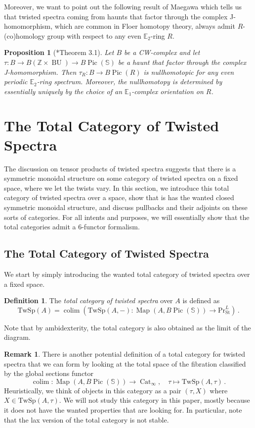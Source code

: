 \documentclass[10pt]{amsart}
\newcommand{\longto}{\longrightarrow}
\theoremstyle{plain}
\newtheorem{proposition}[theorem]{Proposition}
\theoremstyle{definition}
\newtheorem{definition}[theorem]{Definition}
\newtheorem{rmk}[theorem]{Remark}
\DeclareMathOperator*{\colim}{colim}
\DeclareMathOperator{\Pic}{Pic}
\DeclareMathOperator{\Map}{Map}
\DeclareMathOperator{\Cat}{Cat}
\DeclareMathOperator{\BU}{BU}
\newcommand{\St}{\mathrm{St}}
\newcommand{\bE}{\mathbb{E}}
\newcommand{\bS}{\mathbb{S}}
\newcommand{\bZ}{\mathbb{Z}}
\newcommand{\TwSp}{\mathrm{TwSp}}
\begin{document}
Moreover, we want to point out the following result of Maegawa which tells us that twisted spectra coming from haunts that factor through the complex J-homomorphism, which are common in Floer homotopy theory, always admit $R$-(co)homology group with respect to any even $\bE_2$-ring $R$.

\begin{proposition}[\cite{maegawa24}*{Theorem 3.1}]
  Let $B$ be a CW-complex and let $\tau : B \to B(\bZ \times \BU) \to B\Pic(\bS)$ be a haunt that factor through the complex J-homomorphism.
  Then $\tau_{R} : B \to B\Pic(R)$ is nullhomotopic for any even periodic $\bE_2$-ring spectrum.
  Moreover, the nullhomotopy is determined by essentially uniquely by the choice of an $\bE_1$-complex orientation on $R$.
\end{proposition}

\section{The Total Category of Twisted Spectra} \label{sec:total_category}

The discussion on tensor products of twisted spectra suggests that there is a symmetric monoidal structure on some category of twisted spectra on a fixed space, where we let the twists vary.
In this section, we introduce this total category of twisted spectra over a space, show that is has the wanted closed symmetric monoidal structure, and discuss pullbacks and their adjoints on these sorts of categories.
For all intents and purposes, we will essentially show that the total categories admit a 6-functor formalism.

\subsection{The Total Category of Twisted Spectra}

We start by simply introducing the wanted total category of twisted spectra over a fixed space.

\begin{definition}
  The \emph{total category of twisted spectra} over $A$ is defined as
  \[
  \TwSp(A) = \colim\left(\TwSp(A,-) : \Map(A,B\Pic(\bS)) \longto \mathrm{Pr}^{L}_{\St}  \right) \,.
  \]
\end{definition}

Note that by ambidexterity, the total category is also obtained as the limit of the diagram.

\begin{rmk}
  There is another potential definition of a total category for twisted spectra that we can form by looking at the total space of the fibration classified by the global sections functor
  \[
  \colim : \Map(A,B\Pic(\bS)) \longto \Cat_\infty , \quad \tau \mapsto \TwSp(A,\tau) \,.
  \]
  Heuristically, we think of objects in this category as a pair $(\tau,X)$ where $X \in \TwSp(A,\tau)$.
  We will not study this category in this paper, mostly because it does not have the wanted properties that are looking for.
  In particular, note that the lax version of the total category is not stable.
\end{rmk}
\end{document}
